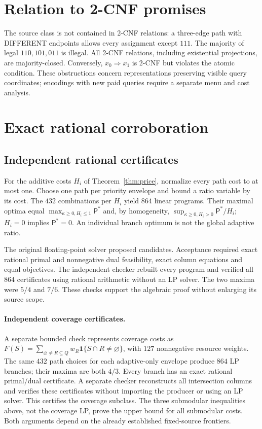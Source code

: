\documentclass[pdflatex,sn-mathphys-num]{sn-jnl}
\newcommand{\Pcost}{\mathsf{P}}
\theoremstyle{thmstyleone}
\theoremstyle{thmstylethree}
\theoremstyle{thmstyletwo}
\begin{document}
\section{Relation to 2-CNF promises}\label{app:structure}
The source class is not contained in 2-CNF relations: a three-edge path with DIFFERENT endpoints allows every assignment except $111$. The majority of legal $110,101,011$ is illegal. All 2-CNF relations, including existential projections, are majority-closed. Conversely, $x_0\Rightarrow x_1$ is 2-CNF but violates the atomic condition. These obstructions concern representations preserving visible query coordinates; encodings with new paid queries require a separate menu and cost analysis.

\section{Exact rational corroboration}\label{app:certificates}
\subsection{Independent rational certificates}
For the additive costs $H_i$ of Theorem~\ref{thm:price}, normalize every path cost to at most one. Choose one path per priority envelope and bound a ratio variable by its cost. The $432$ combinations per $H_i$ yield $864$ linear programs. Their maximal optima equal $\max_{\kappa\geq0,H_i\leq1}\Pcost^*$ and, by homogeneity, $\sup_{\kappa\geq0,H_i>0}\Pcost^*/H_i$; $H_i=0$ implies $\Pcost^*=0$. An individual branch optimum is not the global adaptive ratio.

The original floating-point solver proposed candidates. Acceptance required exact rational primal and nonnegative dual feasibility, exact column equations and equal objectives. The independent checker rebuilt every program and verified all $864$ certificates using rational arithmetic without an LP solver. The two maxima were $5/4$ and $7/6$. These checks support the algebraic proof without enlarging its source scope.
\paragraph*{Independent coverage certificates.}
A separate bounded check represents coverage costs as
$F(S)=\sum_{\varnothing\ne R\subseteq Q}w_R\mathbf1\{S\cap R\ne\varnothing\}$,
with $127$ nonnegative resource weights. The same $432$ path choices for each adaptive-only envelope produce $864$ LP branches; their maxima are both $4/3$. Every branch has an exact rational primal/dual certificate. A separate checker reconstructs all intersection columns and verifies these certificates without importing the producer or using an LP solver. This certifies the coverage subclass. The three submodular inequalities above, not the coverage LP, prove the upper bound for all submodular costs. Both arguments depend on the already established fixed-source frontiers.
\end{document}
